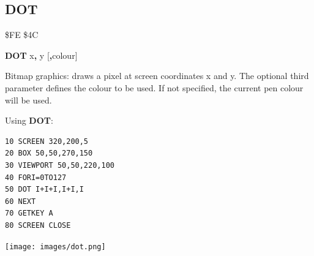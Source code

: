 
\newpage
\subsection{DOT}
\begin{description}[leftmargin=2cm,style=nextline]
\item [Token:] \$FE \$4C
\item [Format:] {\bf DOT} x{\bf,} y [{\bf,}colour]
\item [Usage:] Bitmap graphics: draws a pixel at screen coordinates x and y.
               The optional third parameter defines the colour
               to be used. If not specified, the current
               pen colour will be used.

\item [Example:] Using {\bf DOT}:
\begin{tcolorbox}[colback=black,coltext=white]
\verbatimfont{\codefont}
\begin{verbatim}
10 SCREEN 320,200,5
20 BOX 50,50,270,150
30 VIEWPORT 50,50,220,100
40 FORI=0TO127
50 DOT I+I+I,I+I,I
60 NEXT
70 GETKEY A
80 SCREEN CLOSE
\end{verbatim}
\end{tcolorbox}
\item \begin{center}\texttt{[image: images/dot.png]}\end{center}
\end{description}


\newpage

